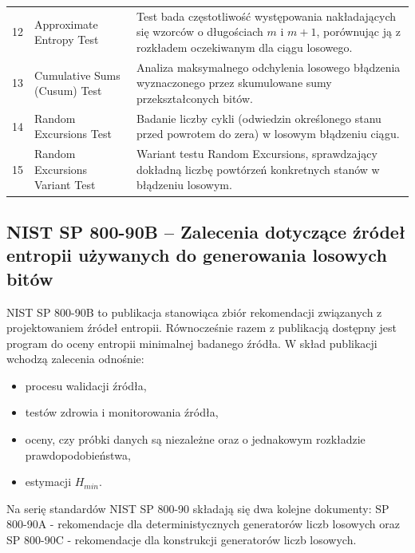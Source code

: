 \begin{table}[htbp]
\begin{tabularx}{\textwidth}{lX p{9.5cm}}
12 & Approximate Entropy Test & Test bada częstotliwość występowania nakładających się wzorców o długościach $m$ i $m+1$, porównując ją z rozkładem oczekiwanym dla ciągu losowego. \\
13 & Cumulative Sums (Cusum) Test & Analiza maksymalnego odchylenia losowego błądzenia wyznaczonego przez skumulowane sumy przekształconych bitów. \\
14 & Random Excursions Test & Badanie liczby cykli (odwiedzin określonego stanu przed powrotem do zera) w losowym błądzeniu ciągu. \\
15 & Random Excursions Variant Test & Wariant testu Random Excursions, sprawdzający dokładną liczbę powtórzeń konkretnych stanów w błądzeniu losowym. \\
\bottomrule
\end{tabularx}
\end{table}



\subsection{NIST SP 800-90B -- Zalecenia dotyczące źródeł entropii
używanych do generowania losowych bitów}

\noindent NIST SP 800-90B to publikacja stanowiąca zbiór 
rekomendacji związanych z projektowaniem źródeł entropii. Równocześnie razem z 
publikacją dostępny jest program do oceny entropii minimalnej badanego źródła. 
W skład publikacji wchodzą zalecenia odnośnie: 

\begin{itemize}
    \item procesu walidacji źródła,
    \item testów zdrowia i monitorowania źródła,
    \item oceny, czy próbki danych są niezależne oraz o jednakowym rozkładzie 
    prawdopodobieństwa,
    \item estymacji $H_{min}$.
\end{itemize}

Na serię standardów NIST SP 800-90 składają się dwa kolejne dokumenty: SP 800-90A - rekomendacje 
dla deterministycznych generatorów liczb losowych oraz SP 800-90C - rekomendacje 
dla konstrukcji generatorów liczb losowych.